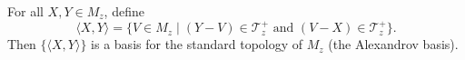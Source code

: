 For all $X, Y \in M_z$, define
$$\langle X, Y \rangle = \{V \in M_z \mid (Y - V) \in \mathcal{T}_z^+ \text{ and } (V - X) \in \mathcal{T}_z^+\}.$$
Then $\{\langle X, Y \rangle\}$ is a basis for the standard topology of $M_z$ (the Alexandrov basis).